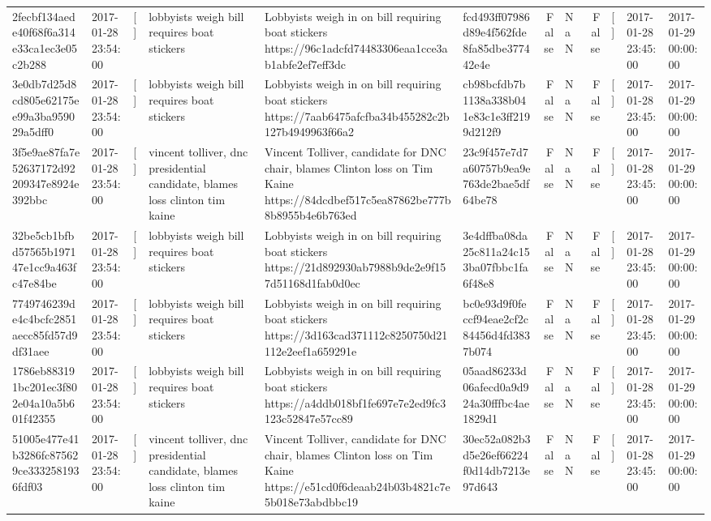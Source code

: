 \begin{tabular}{llllllrlrlll}
2fecbf134aede40f68f6a314e33ca1ec3e05c2b288 & 2017-01-28 23:54:00 & [] & lobbyists weigh bill requires boat stickers & Lobbyists weigh in on bill requiring boat stickers https://96c1adcfd74483306eaa1cce3ab1abfe2ef7eff3dc & fcd493ff07986d89e4f562fde8fa85dbe377442e4e & False & NaN & False & [] & 2017-01-28 23:45:00 & 2017-01-29 00:00:00 \\
3e0db7d25d8cd805e62175ee99a3ba959029a5dff0 & 2017-01-28 23:54:00 & [] & lobbyists weigh bill requires boat stickers & Lobbyists weigh in on bill requiring boat stickers https://7aab6475afcfba34b455282c2b127b4949963f66a2 & cb98bcfdb7b1138a338b041e83c1e3ff2199d212f9 & False & NaN & False & [] & 2017-01-28 23:45:00 & 2017-01-29 00:00:00 \\
3f5e9ae87fa7e52637172d92209347e8924e392bbc & 2017-01-28 23:54:00 & [] & vincent tolliver, dnc presidential candidate, blames loss clinton tim kaine & Vincent Tolliver, candidate for DNC chair, blames Clinton loss on Tim Kaine https://84dcdbef517c5ea87862be777b8b8955b4e6b763ed & 23c9f457e7d7a60757b9ea9e763de2bae5df64be78 & False & NaN & False & [] & 2017-01-28 23:45:00 & 2017-01-29 00:00:00 \\
32be5cb1bfbd57565b197147e1cc9a463fc47e84be & 2017-01-28 23:54:00 & [] & lobbyists weigh bill requires boat stickers & Lobbyists weigh in on bill requiring boat stickers https://21d892930ab7988b9de2e9f157d51168d1fab0d0ec & 3e4dffba08da25c811a24c153ba07fbbc1fa6f48e8 & False & NaN & False & [] & 2017-01-28 23:45:00 & 2017-01-29 00:00:00 \\
7749746239de4c4bcfc2851aecc85fd57d9df31aee & 2017-01-28 23:54:00 & [] & lobbyists weigh bill requires boat stickers & Lobbyists weigh in on bill requiring boat stickers https://3d163cad371112c8250750d21112e2eef1a659291e & bc0e93d9f0feccf94eae2cf2c84456d4fd3837b074 & False & NaN & False & [] & 2017-01-28 23:45:00 & 2017-01-29 00:00:00 \\
1786eb883191bc201ec3f802e04a10a5b601f42355 & 2017-01-28 23:54:00 & [] & lobbyists weigh bill requires boat stickers & Lobbyists weigh in on bill requiring boat stickers https://a4ddb018bf1fe697e7e2ed9fc3123c52847e57cc89 & 05aad86233d06afecd0a9d924a30fffbc4ae1829d1 & False & NaN & False & [] & 2017-01-28 23:45:00 & 2017-01-29 00:00:00 \\
51005e477e41b3286fc875629ce3332581936fdf03 & 2017-01-28 23:54:00 & [] & vincent tolliver, dnc presidential candidate, blames loss clinton tim kaine & Vincent Tolliver, candidate for DNC chair, blames Clinton loss on Tim Kaine https://e51cd0f6deaab24b03b4821c7e5b018e73abdbbc19 & 30ec52a082b3d5e26ef66224f0d14db7213e97d643 & False & NaN & False & [] & 2017-01-28 23:45:00 & 2017-01-29 00:00:00 \\

\end{tabular}
